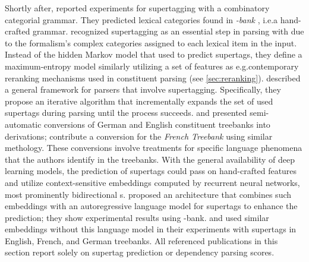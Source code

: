 \documentclass[../document.tex]{subfiles}
\begin{document}
    Shortly after, \citet{clark2002supertagging} reported experiments for supertagging with a combinatory categorial grammar.
    They predicted lexical categories found in \emph{-bank} \citep{Hoc07}, i.e.\@ a hand-crafted grammar.
     recognized supertagging as an essential step in parsing with  due to the formalism's complex categories assigned to each lexical item in the input.
    Instead of the hidden Markov model that \citet{bangalore1999supertagging} used to predict supertags, they define a maximum-entropy model similarly utilizing a set of features as e.g.\@ contemporary reranking mechanisms used in constituent parsing (see \cref{sec:reranking}).
     described a general framework for parsers that involve supertagging.
    Specifically, they propose an iterative algorithm that incrementally expands the set of used supertags during parsing until the process succeeds.
     and \citet{Kaeshammer2012GermanAE} presented semi-automatic conversions of German and English constituent treebanks into  derivations; \citet{Bla18} contribute a conversion for the \emph{French Treebank} \citep{abeille2003building} using similar methology.
    These conversions involve treatments for specific language phenomena that the authors identify in the treebanks.
    With the general availability of deep learning models, the prediction of supertags could pass on hand-crafted features and utilize context-sensitive embeddings computed by recurrent neural networks, most prominently bidirectional s.
     proposed an architecture that combines such embeddings with an autoregressive language model for supertags to enhance the prediction; they show experimental results using -bank.
     and \citet{Bla18} used similar embeddings without this language model in their experiments with  supertags in English, French, and German treebanks.
    All referenced publications in this section report solely on supertag prediction or dependency parsing scores.

    \ifSubfilesClassLoaded{%
        \printindex
    }{}
\end{document}
